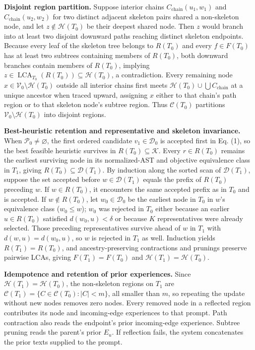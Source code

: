 \documentclass{article}
\begin{document}
\textbf{Disjoint region partition.} Suppose interior chains \(C_{\text{chain}}(u_1,w_1)\) and \(C_{\text{chain}}(u_2,w_2)\) for two distinct adjacent skeleton pairs shared a non-skeleton node, and let \(z\notin\mathcal H(T_0)\) be their deepest shared node. Then \(z\) would branch into at least two disjoint downward paths reaching distinct skeleton endpoints. Because every leaf of the skeleton tree belongs to \(R(T_0)\) and every \(f\in F(T_0)\) has at least two subtrees containing members of \(R(T_0)\), both downward branches contain members of \(R(T_0)\), implying \(z\in\operatorname{LCA}_{T_0}(R(T_0))\subseteq\mathcal H(T_0)\), a contradiction. Every remaining node \(x\in\mathcal V_0\setminus\mathcal H(T_0)\) outside all interior chains first meets \(\mathcal H(T_0)\cup\bigcup C_{\text{chain}}\) at a unique ancestor when traced upward, assigning \(x\) either to that chain's path region or to that skeleton node's subtree region. Thus \(\mathcal C(T_0)\) partitions \(\mathcal V_0\setminus\mathcal H(T_0)\) into disjoint regions.

\textbf{Best-heuristic retention and representative and skeleton invariance.} When \(\mathcal P_0\neq\varnothing\), the first ordered candidate \(v_1\in\mathcal D_0\) is accepted first in Eq. (1), so the best feasible heuristic survives in \(R(T_0)\subseteq\mathcal K\). Every \(r\in R(T_0)\) remains the earliest surviving node in its normalized-AST and objective equivalence class in \(T_1\), giving \(R(T_0)\subseteq\mathcal D(T_1)\). By induction along the sorted scan of \(\mathcal D(T_1)\), suppose the set accepted before \(w\in\mathcal D(T_1)\) equals the prefix of \(R(T_0)\) preceding \(w\). If \(w\in R(T_0)\), it encounters the same accepted prefix as in \(T_0\) and is accepted. If \(w\notin R(T_0)\), let \(w_0\in\mathcal D_0\) be the earliest node in \(T_0\) in \(w\)'s equivalence class (\(w_0\leq w\)); \(w_0\) was rejected in \(T_0\) either because an earlier \(u\in R(T_0)\) satisfied \(d(w_0,u)<\delta\) or because \(K\) representatives were already selected. Those preceding representatives survive ahead of \(w\) in \(T_1\) with \(d(w,u)=d(w_0,u)\), so \(w\) is rejected in \(T_1\) as well. Induction yields \(R(T_1)=R(T_0)\), and ancestry-preserving contractions and prunings preserve pairwise LCAs, giving \(F(T_1)=F(T_0)\) and \(\mathcal H(T_1)=\mathcal H(T_0)\).

\textbf{Idempotence and retention of prior experiences.} Since \(\mathcal H(T_1)=\mathcal H(T_0)\), the non-skeleton regions on \(T_1\) are \(\mathcal C(T_1)=\{C\in\mathcal C(T_0):|C|<m\}\), all smaller than \(m\), so repeating the update without new nodes removes zero nodes. Every removed node in a reflected region contributes its node and incoming-edge experiences to that prompt. Path contraction also reads the endpoint's prior incoming-edge experience. Subtree pruning reads the parent's prior \(E_u\). If reflection fails, the system concatenates the prior texts supplied to the prompt.
\end{document}
